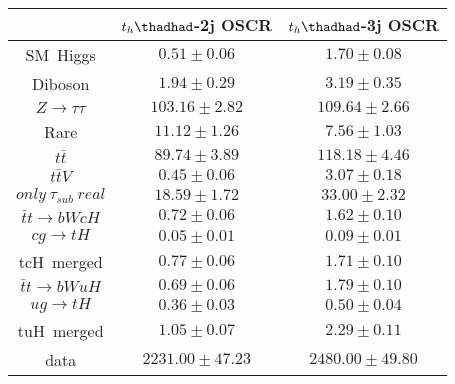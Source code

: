 \centering
\begin{tabular}{ccc} \toprule\toprule
 & $t_{h}\thadhad$-2j OSCR & $t_{h}\thadhad$-3j OSCR\\  \midrule
SM~Higgs               & $0.51\pm0.06$             & $1.70\pm0.08$        \\
Diboson                & $1.94\pm0.29$             & $3.19\pm0.35$        \\
$Z\to\tau\tau$         & $103.16\pm2.82$           & $109.64\pm2.66$      \\
Rare                   & $11.12\pm1.26$            & $7.56\pm1.03$        \\
$t\bar{t}$             & $89.74\pm3.89$            & $118.18\pm4.46$      \\
$t\bar{t}V$            & $0.45\pm0.06$             & $3.07\pm0.18$        \\
$only~\tau_{sub}~real$ & $18.59\pm1.72$            & $33.00\pm2.32$        \\ \midrule\midrule
$\bar{t}t\to bWcH$    & $0.72\pm0.06$      & $1.62\pm0.10$  \\   
$cg\to tH$            & $0.05\pm0.01$      & $0.09\pm0.01$ \\    
tcH~merged            & $0.77\pm0.06$      & $1.71\pm0.10$ \\  \midrule  
$\bar{t}t\to bWuH$    & $0.69\pm0.06$      & $1.79\pm0.10$ \\    
$ug\to tH$            & $0.36\pm0.03$      & $0.50\pm0.04$ \\    
tuH~merged            & $1.05\pm0.07$      & $2.29\pm0.11$ \\\midrule\midrule
data & $2231.00\pm47.23$ & $2480.00\pm49.80$\\
\bottomrule\bottomrule
\end{tabular}